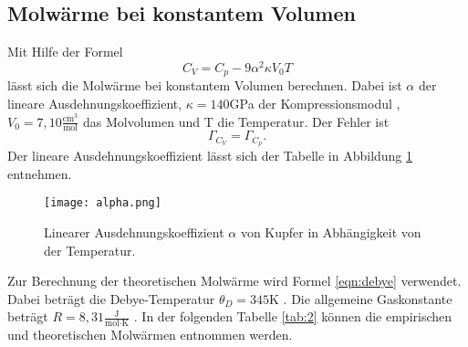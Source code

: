 

\subsection{Molwärme bei konstantem Volumen}
Mit Hilfe der Formel
\begin{equation}
  C_V = C_p - 9\alpha^2\kappa{V_0}T
\end{equation}
lässt sich die Molwärme bei konstantem Volumen berechnen.
Dabei ist $\alpha$ der lineare Ausdehnungskoeffizient, $\kappa = 140$GPa der Kompressionsmodul \cite{kappa}, $V_0 = 7,10\frac{\text{cm}^3}{\text{mol}}$ das Molvolumen \cite{cu} und T die Temperatur.
Der Fehler ist
\begin{equation}
  \Gamma_{C_V} = \Gamma_{C_p}.
\end{equation}
Der lineare Ausdehnungskoeffizient lässt sich der Tabelle in Abbildung \ref{alpha} entnehmen.

\begin{figure}[H]
  \centering
  \texttt{[image: alpha.png]}
  \caption{Linearer Ausdehnungskoeffizient $\alpha$ von Kupfer in Abhängigkeit von der Temperatur. \cite{skript}}
  \label{alpha}
\end{figure}

Zur Berechnung der theoretischen Molwärme wird Formel \eqref{eqn:debye} verwendet.
Dabei beträgt die Debye-Temperatur $\theta_D = 345$K \cite{debye}.
Die allgemeine Gaskonstante beträgt $R = 8,31\frac{\text{J}}{\text{mol}\cdot\text{K}}$ \cite[587]{dem}.
In der folgenden Tabelle \ref{tab:2} können die empirischen und theoretischen Molwärmen entnommen werden.

